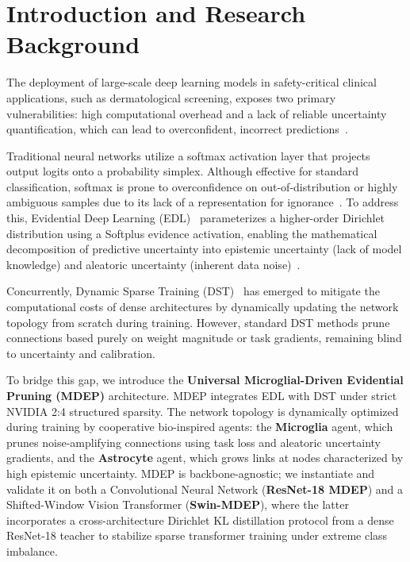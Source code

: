\documentclass[letterpaper]{article} %
\begin{document}
\section{Introduction and Research Background}\label{sec:intro}

The deployment of large-scale deep learning models in safety-critical clinical applications, such as dermatological screening, exposes two primary vulnerabilities: high computational overhead and a lack of reliable uncertainty quantification, which can lead to overconfident, incorrect predictions~\cite{he2016deep, dosovitskiy2021image, esteva2017dermatologist, guo2017calibration}. 

Traditional neural networks utilize a softmax activation layer that projects output logits onto a probability simplex. Although effective for standard classification, softmax is prone to overconfidence on out-of-distribution or highly ambiguous samples due to its lack of a representation for ignorance~\cite{lakshminarayanan2017simple, guo2017calibration}. To address this, Evidential Deep Learning (EDL)~\cite{sensoy2018evidential} parameterizes a higher-order Dirichlet distribution using a Softplus evidence activation, enabling the mathematical decomposition of predictive uncertainty into epistemic uncertainty (lack of model knowledge) and aleatoric uncertainty (inherent data noise)~\cite{sensoy2018evidential, malinin2018predictive}.

Concurrently, Dynamic Sparse Training (DST)~\cite{evci2020rigging, mocanu2018scalable} has emerged to mitigate the computational costs of dense architectures by dynamically updating the network topology from scratch during training. However, standard DST methods prune connections based purely on weight magnitude or task gradients, remaining blind to uncertainty and calibration.

To bridge this gap, we introduce the \textbf{Universal Microglial-Driven Evidential Pruning (MDEP)} architecture. MDEP integrates EDL with DST under strict NVIDIA 2:4 structured sparsity. The network topology is dynamically optimized during training by cooperative bio-inspired agents: the \textbf{Microglia} agent, which prunes noise-amplifying connections using task loss and aleatoric uncertainty gradients, and the \textbf{Astrocyte} agent, which grows links at nodes characterized by high epistemic uncertainty. MDEP is backbone-agnostic; we instantiate and validate it on both a Convolutional Neural Network (\textbf{ResNet-18 MDEP}) and a Shifted-Window Vision Transformer (\textbf{Swin-MDEP}), where the latter incorporates a cross-architecture Dirichlet KL distillation protocol from a dense ResNet-18 teacher to stabilize sparse transformer training under extreme class imbalance.
\end{document}
